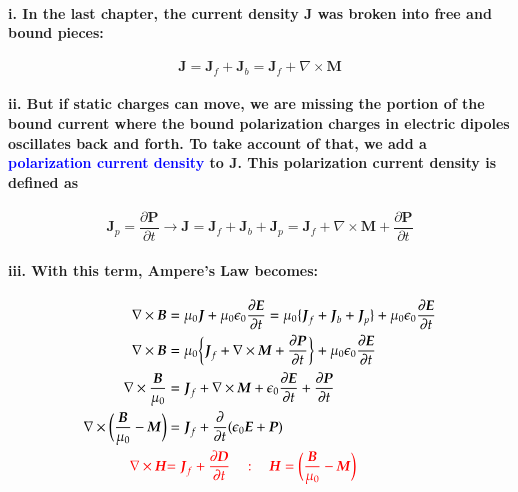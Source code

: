 \documentclass{article}
\begin{document}
\paragraph{\indent\indent i. In the last chapter, the current density $\boldsymbol{J}$ was broken into free and bound pieces:}
\begin{equation*}
    \boldsymbol{J}=\boldsymbol{J}_f+\boldsymbol{J}_b=\boldsymbol{J}_f+\nabla\times\boldsymbol{M}
\end{equation*}
\paragraph{\indent\indent ii. But if static charges can move, we are missing the portion of the bound current where the bound polarization charges in electric dipoles oscillates back and forth. To take account of that, we add a \textcolor{blue}{polarization current density} to $\boldsymbol{J}$. This polarization current density is defined as}
\begin{equation*}
    \boldsymbol{J}_p=\frac{\partial\boldsymbol{P}}{\partial t}\rightarrow \boldsymbol{J}=\boldsymbol{J}_f+\boldsymbol{J}_b+\boldsymbol{J}_p=\boldsymbol{J}_f+\nabla\times\boldsymbol{M}+\frac{\partial \boldsymbol{P}}{\partial t}
\end{equation*}
\paragraph{\indent\indent iii. With this term, Ampere's Law becomes:}
\begin{align*}
    \nabla\times\boldsymbol{B}&=\mu_0\boldsymbol{J}+\mu_0\epsilon_0\frac{\partial\boldsymbol{E}}{\partial t}=\mu_0\{ \boldsymbol{J}_f+\boldsymbol{J}_b+\boldsymbol{J}_p\}+\mu_0\epsilon_0\frac{\partial\boldsymbol{E}}{\partial t}\\
    \nabla\times\boldsymbol{B}&=\mu_0\bigg\{ \boldsymbol{J}_f+\nabla\times\boldsymbol{M}+\frac{\partial\boldsymbol{P}}{\partial t}\bigg\} +\mu_0\epsilon_0\frac{\partial\boldsymbol{E}}{\partial t}\\
    \nabla\times \frac{\boldsymbol{B}}{\mu_0}&=\boldsymbol{J}_f+\nabla\times\boldsymbol{M}+\epsilon_0\frac{\partial\boldsymbol{E}}{\partial t}+\frac{\partial\boldsymbol{P}}{\partial t}\\
    \nabla\times\bigg( \frac{\boldsymbol{B}}{\mu_0}-\boldsymbol{M}\bigg)&=\boldsymbol{J}_f+\frac{\partial}{\partial t}(\epsilon_0\boldsymbol{E}+\boldsymbol{P})\\
    \textcolor{red}{\nabla\times\boldsymbol{H}}&\textcolor{red}{=\boldsymbol{J}_f+\frac{\partial\boldsymbol{D}}{\partial t}\quad:\quad \boldsymbol{H}=\bigg( \frac{\boldsymbol{B}}{\mu_0}-\boldsymbol{M}\bigg)}
\end{align*}
\end{document}
